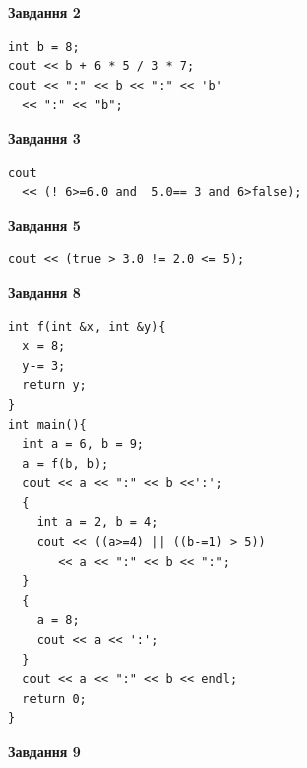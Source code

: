 \documentclass[12pt, ukrainian]{article}
\begin{document}
{\begin {large}
\begin{minipage}[t]{7.0cm}
\end{minipage}
\vline \hspace{1mm}
\begin{minipage}[t]{11.0cm}

\begin{center}
\textbf{Завдання 2}
\end{center}
\vspace{-8mm}

\begin{verbatim}
int b = 8;
cout << b + 6 * 5 / 3 * 7;
cout << ":" << b << ":" << 'b' 
  << ":" << "b";
\end{verbatim}



\begin{center}
\textbf{Завдання 3}
\end{center}
\vspace{-8mm}

\begin{verbatim}
cout 
  << (! 6>=6.0 and  5.0== 3 and 6>false);
\end{verbatim}



\begin{center}
\textbf{Завдання 5}
\end{center}
\vspace{-8mm}

\begin{verbatim}
cout << (true > 3.0 != 2.0 <= 5);
\end{verbatim}



\begin{center}
\textbf{Завдання 8}
\end{center}
\vspace{-8mm}

\begin{verbatim}
int f(int &x, int &y){
  x = 8;
  y-= 3;
  return y;
}
int main(){
  int a = 6, b = 9;
  a = f(b, b);
  cout << a << ":" << b <<':';
  {
    int a = 2, b = 4;
    cout << ((a>=4) || ((b-=1) > 5))
       << a << ":" << b << ":";
  }
  {
    a = 8;
    cout << a << ':';
  }
  cout << a << ":" << b << endl;
  return 0;
}
\end{verbatim}

\end{minipage}


\begin{minipage}[t]{7.0cm}

\begin{center}
\textbf{Завдання 9}
\end{center}
\vspace{-8mm}


\end{minipage}
\end{large}}
\end{document}
